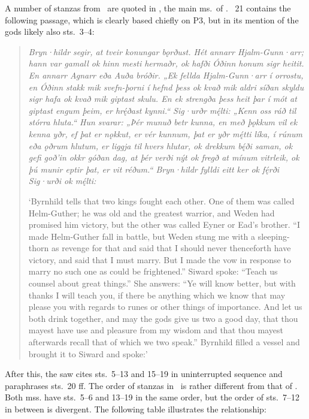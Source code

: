 A number of stanzas from \Sigrdrifumal\ are quoted in \VolsungaMS, the main ms.~of \VolsungaSaga.  \VolsungaSaga\ 21 contains the following passage, which is clearly based chiefly on  P3, but in its mention of the gods likely also sts.~3--4:

\begin{quote}\begin{small}
  \emph{Bryn·hildr segir, at tveir konungar bǫrðust. Hét annarr Hjalm-Gunn·arr; hann var gamall ok hinn mesti hermaðr, ok hafði Óðinn honum sigr heitit. En annarr Agnarr eða Auða bróðir. „Ek fellda Hjalm-Gunn·arr í orrostu, en Óðinn stakk mik svefn-þorni í hefnd þess ok kvað mik aldri síðan skyldu sigr hafa ok kvað mik giptast skulu. En ek strengða þess heit þar í mót at giptast engum þeim, er hrę́ðast kynni.“ Sig·urðr mę́lti: „Kenn oss ráð til stórra hluta.“ Hun svarar: „Þér munuð betr kunna, en með þǫkkum vil ek kenna yðr, ef þat er nǫkkut, er vér kunnum, þat er yðr mę́tti líka, í rúnum eða ǫðrum hlutum, er liggja til hvers hlutar, ok drekkum bę́ði saman, ok gefi goð’in okkr góðan dag, at þér verði nýt ok fregð at mínum vitrleik, ok þú munir eptir þat, er vit réðum.“ Bryn·hildr fylldi eitt ker ok fę́rði Sig·urði ok mę́lti:}

  ‘Byrnhild tells that two kings fought each other.  One of them was called Helm-Guther; he was old and the greatest warrior, and Weden had promised him victory, but the other was called Eyner or Ead’s brother.  “I made Helm-Guther fall in battle, but Weden stung me with a sleeping-thorn as revenge for that and said that I should never thenceforth have victory, and said that I must marry.  But I made the vow in response to marry no such one as could be frightened.” Siward spoke: “Teach us counsel about great things.” She answers: “Ye will know better, but with thanks I will teach you, if there be anything which we know that may please you with regards to runes or other things of importance.  And let us both drink together, and may the gods give us two a good day, that thou mayest have use and pleasure from my wisdom and that thou mayest afterwards recall that of which we two speak.” Byrnhild filled a vessel and brought it to Siward and spoke:’
\end{small}\end{quote}

After this, the saw cites sts.~5--13 and 15--19 in uninterrupted sequence and paraphrases sts.~20 ff.
The order of stanzas in \VolsungaMS\ is rather different from that of \Regius.  Both mss. have sts.~5--6 and 13--19 in the same order, but the order of sts.~7--12 in between is divergent.  The following table illustrates the relationship:

